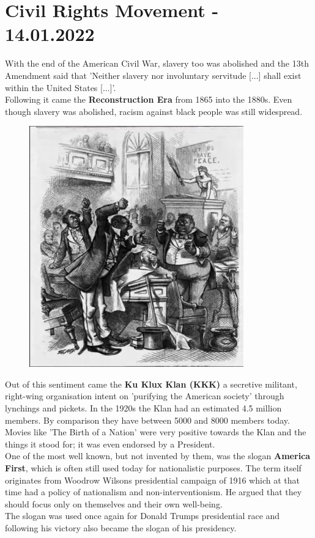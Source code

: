 \documentclass{article}
\begin{document}
	\section{Civil Rights Movement - 14.01.2022}
	With the end of the American Civil War, slavery too was abolished and the 13th Amendment said that 'Neither slavery nor involuntary servitude [...] shall exist within the United States [...]'. \\
	Following it came the \textbf{Reconstruction Era} from 1865 into the 1880s. Even though slavery was abolished, racism against black people was still widespread.  \\
	\begin{figure}[H]
	\centering
	\includegraphics{images/Black_Quarrels.png}
	\end{figure}
	Out of this sentiment came the \textbf{Ku Klux Klan (KKK)} a secretive militant, right-wing organisation intent on 'purifying the American society' through lynchings and pickets. In the 1920s the Klan had an estimated 4.5 million members. By comparison they have between 5000 and 8000 members today. Movies like 'The Birth of a Nation' were very positive towards the Klan and the things it stood for; it was even endorsed by a President. \\
	One of the most well known, but not invented by them, was the slogan \textbf{America First}, which is often still used today for nationalistic purposes. The term itself originates from Woodrow Wilsons presidential campaign of 1916 which at that time had a policy of nationalism and non-interventionism. He argued that they should focus only on themselves and their own well-being. \\
	The slogan was used once again for Donald Trumps presidential race and following his victory also became the slogan of his presidency.
\end{document}
